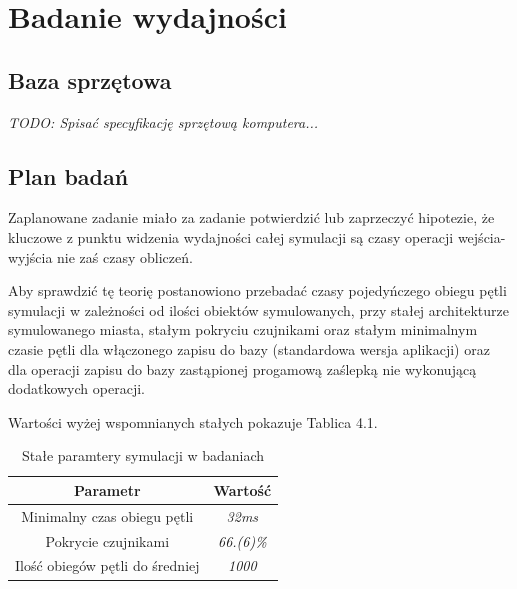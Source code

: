 \chapter{Badanie wydajności}
\section{Baza sprzętowa}
\par{
\textit{
TODO: Spisać specyfikację sprzętową komputera...
}
}

\section{Plan badań}
\par{
Zaplanowane zadanie miało za zadanie potwierdzić lub zaprzeczyć hipotezie, że kluczowe z punktu widzenia wydajności całej symulacji są czasy operacji wejścia-wyjścia nie zaś czasy obliczeń.
}
\par{
Aby sprawdzić tę teorię postanowiono przebadać czasy pojedyńczego obiegu pętli symulacji w zależności od ilości obiektów symulowanych, przy stałej architekturze symulowanego miasta, stałym pokryciu czujnikami oraz stałym minimalnym czasie pętli dla włączonego zapisu do bazy (standardowa wersja aplikacji) oraz dla operacji zapisu do bazy zastąpionej progamową zaślepką nie wykonującą dodatkowych operacji.
}
\par{
Wartości wyżej wspomnianych stałych pokazuje Tablica 4.1.
}
\par{
\begin{table}[t]
\caption{Stałe paramtery symulacji w badaniach}
\label{Tabela 1}
\begin{center}
\begin{tabular}{|c|c|}
  \hline 
  \textbf{Parametr} & \textbf{Wartość} \\
  \hline
  Minimalny czas obiegu pętli & \textit{32ms} \\
  Pokrycie czujnikami & \textit{66.(6)\%} \\
  Ilość obiegów pętli do średniej & \textit{1000} \\
  \hline  
\end{tabular}
\end{center}
\end{table}
}

